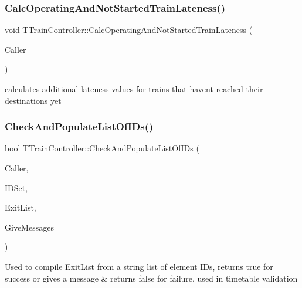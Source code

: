 \subsubsection{\texorpdfstring{Calc\+Operating\+And\+Not\+Started\+Train\+Lateness()}{CalcOperatingAndNotStartedTrainLateness()}}
{\footnotesize\ttfamily void T\+Train\+Controller\+::\+Calc\+Operating\+And\+Not\+Started\+Train\+Lateness (\begin{DoxyParamCaption}\item[{int}]{Caller }\end{DoxyParamCaption})}

calculates additional lateness values for trains that haven\textquotesingle{}t reached their destinations yet \mbox{\label{class_t_train_controller_ae91c1a77699c9daf327938081eab2241}} 
\subsubsection{\texorpdfstring{Check\+And\+Populate\+List\+Of\+I\+Ds()}{CheckAndPopulateListOfIDs()}}
{\footnotesize\ttfamily bool T\+Train\+Controller\+::\+Check\+And\+Populate\+List\+Of\+I\+Ds (\begin{DoxyParamCaption}\item[{int}]{Caller,  }\item[{Ansi\+String}]{I\+D\+Set,  }\item[{T\+Exit\+List \&}]{Exit\+List,  }\item[{bool}]{Give\+Messages }\end{DoxyParamCaption})}

Used to compile Exit\+List from a string list of element I\+Ds, returns true for success or gives a message \& returns false for failure, used in timetable validation \mbox{\label{class_t_train_controller_a72662be9ecd0e95131779bd10b6fe14f}} 
